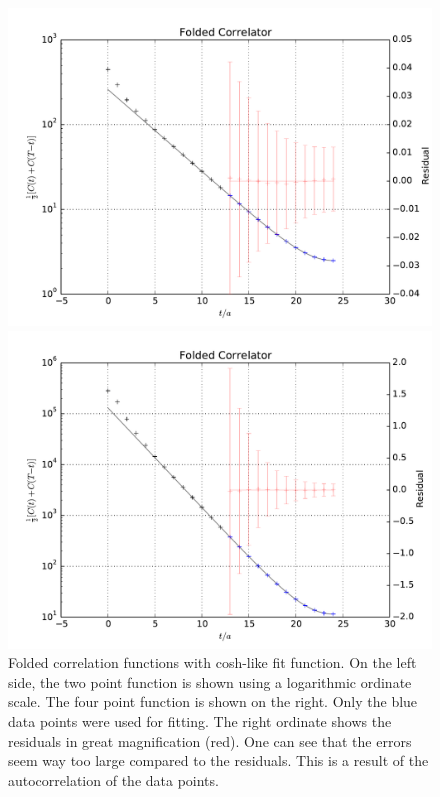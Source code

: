 \documentclass[11pt, english, fleqn, DIV=10, headinclude]{scrartcl}
\begin{document}
\begin{figure}[htbp]
    \centering
    \begin{minipage}[c]{0.49\linewidth}
        \centering
        \includegraphics[width=\linewidth]{plots/A100_24_L24_T48_beta190_mul0100_musig150_mudel190_kappa1632550__ev120__TB2_SO_LI6_new_c2_folded.pdf}
    \end{minipage}
    \hfill
    \begin{minipage}[c]{0.49\linewidth}
        \centering
        \includegraphics[width=\linewidth]{plots/A100_24_L24_T48_beta190_mul0100_musig150_mudel190_kappa1632550__ev120__TB2_SO_LI6_new_c4_folded.pdf}
    \end{minipage}
    \caption{%
        Folded correlation functions with cosh-like fit function. On the left
        side, the two point function is shown using a logarithmic ordinate
        scale. The four point function is shown on the right. Only the blue
        data points were used for fitting. The right ordinate shows the
        residuals in great magnification (red). One can see that the errors
        seem way too large compared to the residuals. This is a result of the
        autocorrelation of the data points.
    }
    \label{fig:folded}
\end{figure}
\end{document}
